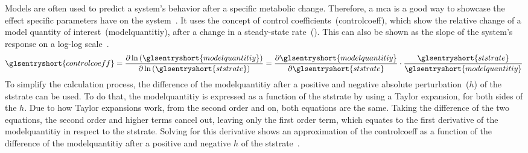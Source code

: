 Models are often used to predict a system's behavior after a specific metabolic change. Therefore, a \gls{mca} is a good way to showcase the effect specific parameters have on the system~\cite{delgadoMetabolicControlAnalysis1992, wildermuthMetabolicControlAnalysis2000}. It uses the concept of control coefficients~(\gls{controlcoeff}), which show the relative change of a model quantity of interest~(\gls{modelquantitiy}), after a change in a steady-state rate~(). This can also be shown as the slope of the system's response on a log-log scale~.
\begin{equation}\label{eq:control-coefficient}
    \glsentryshort{controlcoeff} = \frac{\partial \ln\left(\glsentryshort{modelquantitiy}\right)}{\partial \ln\left(\glsentryshort{ststrate}\right)} = \frac{\partial \glsentryshort{modelquantitiy}}{\partial \glsentryshort{ststrate}} \cdot \frac{\glsentryshort{ststrate}}{\glsentryshort{modelquantitiy}}\\
\end{equation}
To simplify the calculation process, the difference of the \gls{modelquantitiy} after a positive and negative absolute perturbation~($h$) of the \gls{ststrate} can be used. To do that, the \gls{modelquantitiy} is expressed as a function of the \gls{ststrate} by using a Taylor expansion, for both sides of the $h$. Due to how Taylor expansions work, from the second order and on, both equations are the same. Taking the difference of the two equations, the second order and higher terms cancel out, leaving only the first order term, which equates to the first derivative of the \gls{modelquantitiy} in respect to the \gls{ststrate}. Solving for this derivative shows an approximation of the \gls{controlcoeff} as a function of the difference of the \gls{modelquantitiy} after a positive and negative $h$ of the \gls{ststrate}~.
